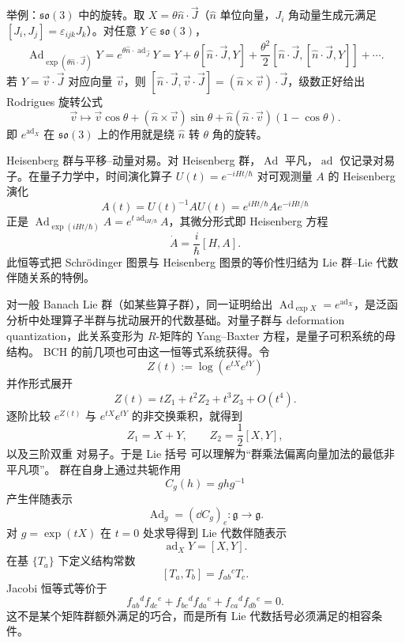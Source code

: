 举例：$\mathfrak{so}(3)$ 中的旋转。取 $X=\theta\hat n\cdot\vec J$（$\hat n$ 单位向量，$J_i$ 角动量生成元满足 $[J_i,J_j]=\varepsilon_{ijk}J_k$）。对任意 $Y\in\mathfrak{so}(3)$，
\[
\operatorname{Ad}_{\exp(\theta\hat n\cdot\vec J)}Y
=e^{\theta\hat n\cdot\operatorname{ad}_{\vec J}}Y
=Y+\theta[\hat n\cdot\vec J,Y]+\frac{\theta^2}{2}[\hat n\cdot\vec J,[\hat n\cdot\vec J,Y]]+\cdots.
\]
若 $Y=\vec v\cdot\vec J$ 对应向量 $\vec v$，则 $[\hat n\cdot\vec J,\vec v\cdot\vec J]=(\hat n\times\vec v)\cdot\vec J$，级数正好给出 Rodrigues 旋转公式
\[
\vec v\mapsto \vec v\cos\theta+(\hat n\times\vec v)\sin\theta+\hat n(\hat n\cdot\vec v)(1-\cos\theta).
\]
即 $e^{\operatorname{ad}_X}$ 在 $\mathfrak{so}(3)$ 上的作用就是绕 $\hat n$ 转 $\theta$ 角的旋转。

Heisenberg 群与平移--动量对易。对 Heisenberg 群，$\operatorname{Ad}$ 平凡，$\operatorname{ad}$ 仅记录对易子。在量子力学中，时间演化算子 $U(t)=e^{-iHt/\hbar}$ 对可观测量 $A$ 的 Heisenberg 演化
\[
A(t)=U(t)^{-1}AU(t)=e^{iHt/\hbar}Ae^{-iHt/\hbar}
\]
正是 $\operatorname{Ad}_{\exp(iHt/\hbar)}A=e^{t\operatorname{ad}_{iH/\hbar}}A$，其微分形式即 Heisenberg 方程
\[
\dot A=\frac{i}{\hbar}[H,A].
\]
此恒等式把 Schrödinger 图景与 Heisenberg 图景的等价性归结为 Lie 群--Lie 代数伴随关系的特例。

对一般 Banach Lie 群（如某些算子群），同一证明给出 $\operatorname{Ad}_{\exp X}=e^{\operatorname{ad}_X}$，是泛函分析中处理算子半群与扰动展开的代数基础。对量子群与 deformation quantization，此关系变形为 $R$-矩阵的 Yang--Baxter 方程，是量子可积系统的母结构。
BCH 的前几项也可由这一恒等式系统获得。令
\[
Z(t):=\log(e^{tX}e^{tY})
\]
并作形式展开
\[
Z(t)=tZ_1+t^2Z_2+t^3Z_3+O(t^4).
\]
逐阶比较 $e^{Z(t)}$ 与 $e^{tX}e^{tY}$ 的非交换乘积，就得到
\[
Z_1=X+Y,
\qquad
Z_2=\frac12[X,Y],
\]
以及三阶双重 对易子。于是 Lie 括号 可以理解为“群乘法偏离向量加法的最低非平凡项”。
群在自身上通过共轭作用
\[
C_g(h)=ghg^{-1}
\]
产生伴随表示
\[
\operatorname{Ad}_g
=(\dd C_g)_e:\mathfrak g\to\mathfrak g.
\]
对 $g=\exp(tX)$ 在 $t=0$ 处求导得到 Lie 代数伴随表示
\[
\operatorname{ad}_X Y=[X,Y].
\]
在基 $\{T_a\}$ 下定义结构常数
\[
[T_a,T_b]=f_{ab}{}^cT_c.
\]
Jacobi 恒等式等价于
\begin{equation*}f_{ab}{}^d f_{dc}{}^e
+f_{bc}{}^d f_{da}{}^e
+f_{ca}{}^d f_{db}{}^e=0.\end{equation*}
这不是某个矩阵群额外满足的巧合，而是所有 Lie 代数括号必须满足的相容条件。

